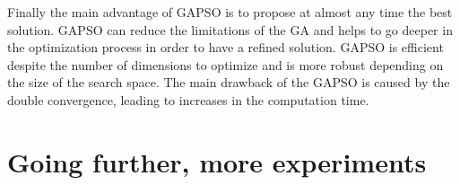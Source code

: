 Finally the main advantage of GAPSO is to propose at almost any time the best solution.%
GAPSO can reduce the limitations of the GA and helps to go deeper in the optimization process in order to have a refined solution. %
 GAPSO is efficient despite the number of dimensions to optimize and is more robust depending on the size of the search space.
The main drawback of the GAPSO is caused by the double convergence, leading to increases in the computation time.
 
   
		
\section{Going further, more experiments }\label{sec:GoingFurtherWaypointPose}

